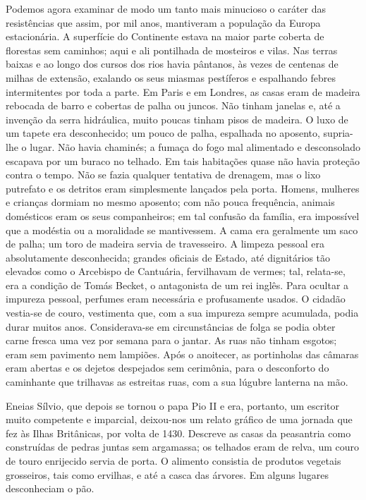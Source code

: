 \documentclass[11pt,a5paper,twoside,openany]{book}
\begin{document}
Podemos agora examinar de modo um tanto mais minucioso o caráter das resistências que assim, por mil anos, mantiveram a população da Europa estacionária. A superfície do Continente estava na maior parte coberta de florestas sem caminhos; aqui e ali pontilhada de mosteiros e vilas. Nas terras baixas e ao longo dos cursos dos rios havia pântanos, às vezes de centenas de milhas de extensão, exalando os seus miasmas pestíferos e espalhando febres intermitentes por toda a parte. Em Paris e em Londres, as casas eram de madeira rebocada de barro e cobertas de palha ou juncos. Não tinham janelas e, até a invenção da serra hidráulica, muito poucas tinham pisos de madeira. O luxo de um tapete era desconhecido; um pouco de palha, espalhada no aposento, supria-lhe o lugar. Não havia chaminés; a fumaça do fogo mal alimentado e desconsolado escapava por um buraco no telhado. Em tais habitações quase não havia proteção contra o tempo. Não se fazia qualquer tentativa de drenagem, mas o lixo putrefato e os detritos eram simplesmente lançados pela porta. Homens, mulheres e crianças dormiam no mesmo aposento; com não pouca frequência, animais domésticos eram os seus companheiros; em tal confusão da família, era impossível que a modéstia ou a moralidade se mantivessem. A cama era geralmente um saco de palha; um toro de madeira servia de travesseiro. A limpeza pessoal era absolutamente desconhecida; grandes oficiais de Estado, até dignitários tão elevados como o Arcebispo de Cantuária, fervilhavam de vermes; tal, relata-se, era a condição de Tomás Becket, o antagonista de um rei inglês. Para ocultar a impureza pessoal, perfumes eram necessária e profusamente usados. O cidadão vestia-se de couro, vestimenta que, com a sua impureza sempre acumulada, podia durar muitos anos. Considerava-se em circunstâncias de folga se podia obter carne fresca uma vez por semana para o jantar. As ruas não tinham esgotos; eram sem pavimento nem lampiões. Após o anoitecer, as portinholas das câmaras eram abertas e os dejetos despejados sem cerimônia, para o desconforto do caminhante que trilhavas as estreitas ruas, com a sua lúgubre lanterna na mão.

Eneias Sílvio, que depois se tornou o papa Pio II e era, portanto, um escritor muito competente e imparcial, deixou-nos um relato gráfico de uma jornada que fez às Ilhas Britânicas, por volta de 1430. Descreve as casas da peasantria como construídas de pedras juntas sem argamassa; os telhados eram de relva, um couro de touro enrijecido servia de porta. O alimento consistia de produtos vegetais grosseiros, tais como ervilhas, e até a casca das árvores. Em alguns lugares desconheciam o pão.
\end{document}
